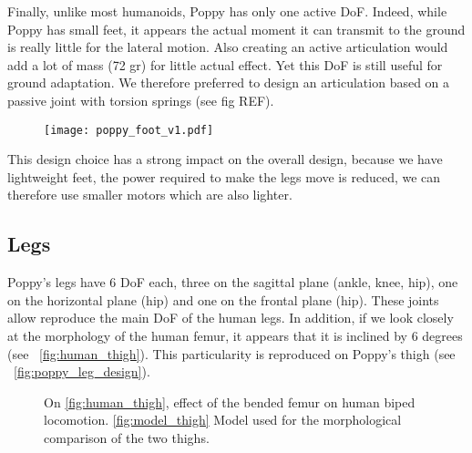 Finally, unlike most humanoids, Poppy has only one active DoF. Indeed, while Poppy has small feet, it appears the actual moment it can transmit to the ground is really little for the lateral motion. Also creating an active articulation would add a lot of mass (72 gr) for little actual effect. Yet this DoF is still useful for ground adaptation. We therefore preferred to design an articulation based on a passive joint with torsion springs (see fig REF).






\begin{figure}[p]
    \begin{center}
        \texttt{[image: poppy\_foot\_v1.pdf]}
    \end{center}
    \caption{}
    \label{fig:poppy-foot-v1-design}
\end{figure}


This design choice has a strong impact on the overall design, because we have lightweight feet, the power required to make the legs move is reduced, we can therefore use smaller motors which are also lighter.


\subsection{Legs} %

Poppy's legs have 6 DoF each, three on the sagittal plane (ankle, knee, hip), one on the horizontal plane (hip) and one on the frontal plane (hip). These joints allow reproduce the main DoF of the human legs. In addition, if we look closely at the morphology of the human femur, it appears that it is inclined by 6 degrees (see \figurename~\ref{fig:human_thigh}). This particularity is reproduced on Poppy's thigh (see \figurename~\ref{fig:poppy_leg_design}).

\begin{figure}[tb]
\centering
    \hfil
    \caption{ On \ref{fig:human_thigh}, effect of the bended femur on human biped locomotion. \ref{fig:model_thigh} Model used for the morphological comparison of the two thighs.}
    \label{fig:poppy_thigh}
\end{figure}


